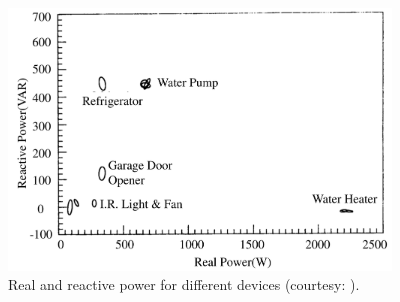 \begin{figure}[ht]
\centering
\includegraphics[width=4in]{figs/realReactive_hart1992.pdf}
\caption{Real and reactive power for different devices (courtesy: \cite{hart1992}).}
\label{fig_realReactive_hart1992}
\end{figure}
